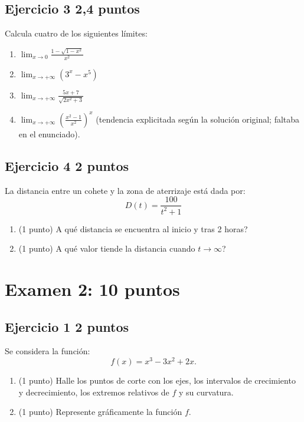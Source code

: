 \documentclass[11pt]{article}
\begin{document}
\clearpage
\subsection*{Ejercicio 3 \hfill 2,4 puntos} Calcula cuatro de los siguientes límites:


\begin{enumerate}[label=(\alph*)]
\item \( \displaystyle \lim_{x \to 0} \frac{1 - \sqrt{1 - x^2}}{x^2} \)



\item \( \displaystyle \lim_{x \to +\infty} (3^x - x^5) \)



\item \( \displaystyle \lim_{x \to +\infty} \frac{5x + 7}{\sqrt{2x^2 + 3}} \)



\item \( \displaystyle\lim_{x\to+\infty}\left(\frac{x^2-1}{x^2}\right)^x\) (tendencia explicitada según la solución original; faltaba en el enunciado).


\end{enumerate}


\subsection*{Ejercicio 4 \hfill 2 puntos} La distancia entre un cohete y la zona de aterrizaje está dada por:
\[
D(t) = \frac{100}{t^2 + 1}
\]

\begin{enumerate}[label=(\alph*)]
\item (1 punto)  \textquestiondown{}A qué distancia se encuentra al inicio y tras 2 horas?



\item (1 punto)  \textquestiondown{}A qué valor tiende la distancia cuando \( t \to \infty \)?


\end{enumerate}






\clearpage
\section*{Examen 2: 10 puntos}
\subsection*{Ejercicio 1 \hfill 2 puntos} Se considera la función:
\[
f(x) = x^3 - 3x^2 + 2x.
\]
\begin{enumerate}[label=(\alph*)]
\item (1 punto) Halle los puntos de corte con los ejes, los intervalos de crecimiento y decrecimiento, los extremos relativos de \(f\) y su curvatura.



\item (1 punto) Represente gráficamente la función \(f\).


\end{enumerate}
\end{document}
